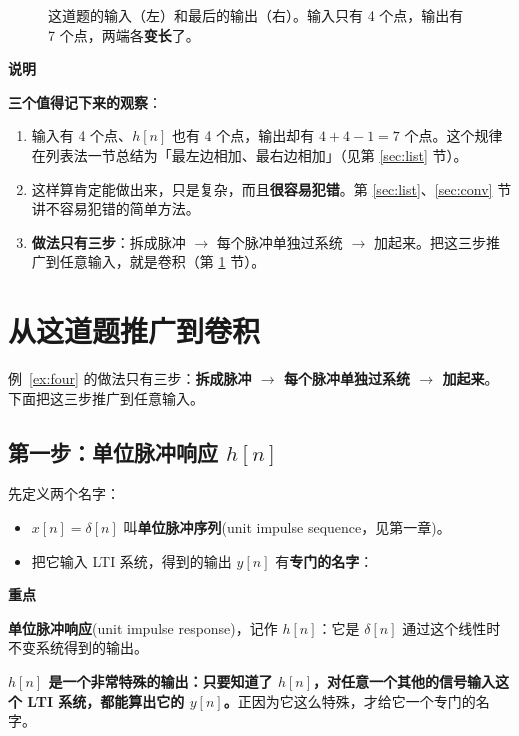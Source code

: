 \documentclass[UTF8,a4paper,11pt]{ctexart}
\newenvironment{remember}{\begin{rememberbox}\textbf{重点}\par\smallskip}{\end{rememberbox}}
\newenvironment{note}{\begin{notebox}\textbf{说明}\par\smallskip}{\end{notebox}}
\newcommand{\stemr}[7]{%
  \begin{scope}[shift={(#1,#2)},x=0.38cm,y=#5 cm]
    \pgfmathtruncatemacro{\len}{dim({#4,0})-1}%
    \pgfmathtruncatemacro{\ymax}{max(#4,#4)}%
    \pgfmathtruncatemacro{\ymin}{min(#4,#4)}%
    \pgfmathsetmacro{\ybot}{min(-0.45/#5,\ymin-0.12/#5)}%
    \draw[->] ({#6-0.5},0) -- ({#7+0.7},0) node[right,font=\tiny] {$n$};
    \draw[->] (0,\ybot) -- (0,{1.9/#5});
    \foreach \v [count=\k from 0] in {#4}{%
      \pgfmathtruncatemacro{\nn}{#3+\k}
      \draw[thick,blue!60!black] (\nn,0) -- (\nn,\v);
      \node[circle,fill=blue!60!black,inner sep=1.1pt] at (\nn,\v) {};
      \ifnum\nn<0 \def\side{east}\else\def\side{west}\fi
      \ifnum\v>0 \node[font=\scriptsize,anchor=south \side,inner sep=1pt] at (\nn,\v) {\v};\fi
      \ifnum\v<0 \node[font=\scriptsize,anchor=north \side,inner sep=1pt] at (\nn,\v) {\v};\fi}%
    \foreach \t in {#6,...,#7}{%
      \pgfmathtruncatemacro{\kk}{\t-(#3)}%
      \def\vv{0}%
      \ifnum\kk>-1 \ifnum\kk<\len\relax \pgfmathtruncatemacro{\vv}{{#4,0}[\kk]}\fi\fi
      \draw (\t,0) -- (\t,{-0.09/#5});
      \ifnum\vv<0
        \node[font=\tiny,gray!60!black,anchor=south,fill=white,inner sep=0.6pt] at (\t,{0.04/#5}) {$\t$};
      \else
        \node[font=\tiny,gray!60!black,anchor=north,fill=white,inner sep=0.6pt] at (\t,{-0.09/#5}) {$\t$};
      \fi}%
    \ifnum\ymax>0
      \draw (0,\ymax) -- (-0.2,\ymax) node[anchor=east,font=\tiny,gray!60!black,fill=white,inner sep=0.6pt] {$\ymax$};
    \fi
    \pgfmathtruncatemacro{\showmin}{(\ymin*#5)<-0.33}%
    \ifnum\showmin=1
      \draw (0,\ymin) -- (-0.2,\ymin) node[anchor=east,font=\tiny,gray!60!black,fill=white,inner sep=0.6pt] {$\ymin$};
    \fi
  \end{scope}}
\newcommand{\stemat}[5]{\stemr{#1}{#2}{#3}{#4}{#5}{-3}{5}}
\newcommand{\ltirow}[9]{%
  \node[anchor=east,font=\footnotesize] at (2.9,{#1+0.7}) {#7};
  \stemat{4.6}{#1}{#2}{#3}{#6}
  \draw[->,thick] (6.9,{#1+0.5}) -- (7.9,{#1+0.5});
  \node[font=\footnotesize,above] at (7.4,{#1+0.5}) {LTI};
  \stemat{10.6}{#1}{#4}{#5}{#9}
  \node[anchor=west,font=\footnotesize,text width=2.4cm] at (12.9,{#1+0.7}) {#8};}
\newcounter{ex}[section]
\begin{document}
\begin{figure}[H]
\centering
{}
\caption{这道题的输入（左）和最后的输出（右）。输入只有 4 个点，输出有 7 个点，两端各\textbf{变长}了。}
\end{figure}

\begin{note}
\textbf{三个值得记下来的观察}：
\begin{enumerate}[nosep]
\item 输入有 4 个点、$h[n]$ 也有 4 个点，输出却有 $4+4-1=7$ 个点。这个规律在列表法一节总结为「最左边相加、最右边相加」（见第 \ref{sec:list} 节）。
\item 这样算肯定能做出来，只是复杂，而且\textbf{很容易犯错}。第 \ref{sec:list}、\ref{sec:conv} 节讲不容易犯错的简单方法。
\item \textbf{做法只有三步}：拆成脉冲 $\to$ 每个脉冲单独过系统 $\to$ 加起来。把这三步推广到任意输入，就是卷积（第 \ref{sec:derive} 节）。
\end{enumerate}
\end{note}

\section{从这道题推广到卷积}\label{sec:derive}
例~\ref{ex:four} 的做法只有三步：\textbf{拆成脉冲 $\to$ 每个脉冲单独过系统 $\to$ 加起来}。下面把这三步推广到任意输入。

\subsection{\texorpdfstring{第一步：单位脉冲响应 $h[n]$}{第一步：单位脉冲响应 h[n]}}
先定义两个名字：
\begin{itemize}
\item $x[n]=\delta[n]$ 叫\textbf{单位脉冲序列}(unit impulse sequence，见第一章)。
\item 把它输入 LTI 系统，得到的输出 $y[n]$ 有\textbf{专门的名字}：
\end{itemize}

\begin{remember}
\textbf{单位脉冲响应}(unit impulse response)，记作 $h[n]$：它是 $\delta[n]$ 通过这个线性时不变系统得到的输出。

\medskip
\textbf{$h[n]$ 是一个非常特殊的输出：只要知道了 $h[n]$，对任意一个其他的信号输入这个 LTI 系统，都能算出它的 $y[n]$。}正因为它这么特殊，才给它一个专门的名字。
\end{remember}
\end{document}
